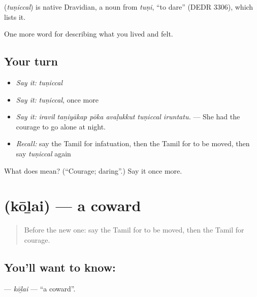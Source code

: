 \begin{cousinweb}
\textbf{} (\emph{tuṇiccal}) is native Dravidian, a noun from  \emph{tuṇi}, \textquotedblleft{}to dare\textquotedblright{} (DEDR 3306), which lists it.
\end{cousinweb}

\begin{grammarlens}[title={What you've built}]
One more word for describing what you lived and felt.
\end{grammarlens}

\subsection*{Your turn}
\begin{itemize}
\raggedright
  \item \emph{Say it:} \emph{tuṇiccal}
  \item \emph{Say it:} \emph{tuṇiccal}, once more
  \item \emph{Say it:} \emph{iravil taṉiyākap pōka avaḷukkut tuṇiccal iruntatu.} — She had the courage to go alone at night.
  \item \emph{Recall:} say the Tamil for infatuation, then the Tamil for to be moved, then say \emph{tuṇiccal} again
\end{itemize}

\begin{tcolorbox}[breakable,colback=teal!4,colframe=teal!35!black,title={Before you move on}]
What does  mean? (\textquotedblleft{}Courage; daring\textquotedblright{}.) Say it once more.
\end{tcolorbox}
\section[\texorpdfstring{\ta{கோழை} (kōḻai)}{கோழை (kōḻai)}]{ (kōḻai) — a coward}

\label{lesson:TA-C466-kolai}



\begin{quote}
Before the new one: say the Tamil for to be moved, then the Tamil for courage.
\end{quote}

\subsection*{You'll want to know: }
\textbf{} — \emph{kōḻai} — \textquotedblleft{}a coward\textquotedblright{}.

